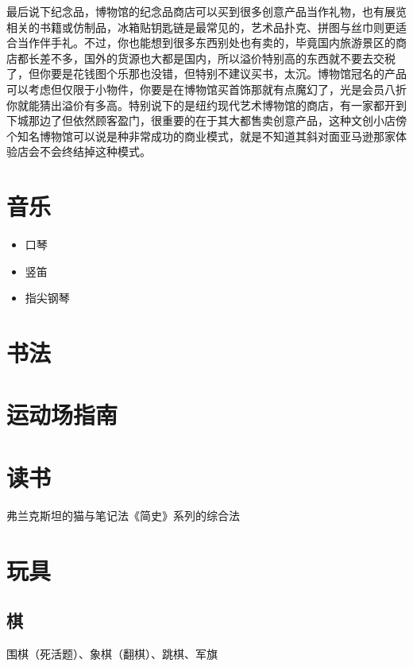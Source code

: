 \documentclass[
  letterpaper,
  DIV=11,
  numbers=noendperiod]{scrreprt}
\begin{document}
最后说下纪念品，博物馆的纪念品商店可以买到很多创意产品当作礼物，也有展览相关的书籍或仿制品，冰箱贴钥匙链是最常见的，艺术品扑克、拼图与丝巾则更适合当作伴手礼。不过，你也能想到很多东西别处也有卖的，毕竟国内旅游景区的商店都长差不多，国外的货源也大都是国内，所以溢价特别高的东西就不要去交税了，但你要是花钱图个乐那也没错，但特别不建议买书，太沉。博物馆冠名的产品可以考虑但仅限于小物件，你要是在博物馆买首饰那就有点魔幻了，光是会员八折你就能猜出溢价有多高。特别说下的是纽约现代艺术博物馆的商店，有一家都开到下城那边了但依然顾客盈门，很重要的在于其大都售卖创意产品，这种文创小店傍个知名博物馆可以说是种非常成功的商业模式，就是不知道其斜对面亚马逊那家体验店会不会终结掉这种模式。

\section{音乐}\label{ux97f3ux4e50}

\begin{itemize}
\item
  口琴
\item
  竖笛
\item
  指尖钢琴
\end{itemize}

\section{书法}\label{ux4e66ux6cd5}

\section{运动场指南}\label{ux8fd0ux52a8ux573aux6307ux5357}

\section{读书}\label{ux8bfbux4e66}

弗兰克斯坦的猫与笔记法《简史》系列的综合法

\section{玩具}\label{ux73a9ux5177}

\subsection{棋}\label{ux68cb}

围棋（死活题）、象棋（翻棋）、跳棋、军旗
\end{document}
